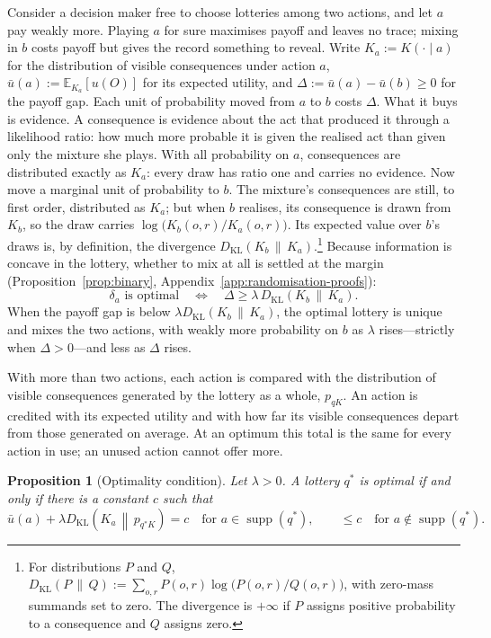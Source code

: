 \documentclass[11pt,a4paper]{article}
\newtheorem{proposition}[theorem]{Proposition}
\theoremstyle{definition}
\newcommand{\E}{\mathbb E}
\newcommand{\supp}{\operatorname{supp}}
\newcommand{\KL}{D_{\mathrm{KL}}}
\newcommand{\1}{\mathbf 1}
\begin{document}
Consider a decision maker free to choose lotteries among two actions, and let $a$ pay weakly more.  Playing $a$ for sure maximises payoff and leaves no
trace; mixing in $b$ costs payoff but gives the record something to reveal.  Write $K_a:=K(\cdot\mid a)$ for the distribution of visible
consequences under action $a$, $\bar u(a):=\E_{K_a}[u(O)]$ for its expected utility, and
$\Delta:=\bar u(a)-\bar u(b)\ge0$ for the payoff gap.  Each unit of probability moved from $a$ to $b$ costs
$\Delta$.  What it buys is evidence.  A consequence is evidence about the act that produced it through a
likelihood ratio: how much more probable it is given the realised act than given only the mixture she plays.
With all probability on $a$, consequences are distributed exactly as $K_a$: every draw has ratio one and
carries no evidence.  Now move a marginal unit of probability to $b$.  The mixture's consequences are still,
to first order, distributed as $K_a$; but when $b$ realises, its consequence is drawn from $K_b$, so the draw
carries $\log\bigl(K_b(o,r)/K_a(o,r)\bigr)$.  Its expected value over $b$'s draws is, by definition, the
divergence $\KL(K_b\,\|\,K_a)$.\footnote{For distributions $P$ and $Q$,
$\KL(P\,\|\,Q):=\sum_{o,r}P(o,r)\log\bigl(P(o,r)/Q(o,r)\bigr)$, with zero-mass summands set to zero.  The
divergence is $+\infty$ if $P$ assigns positive probability to a consequence and $Q$ assigns zero.}  Because
information is concave in the lottery, whether to mix at all is settled at the margin (Proposition~\ref{prop:binary},
Appendix~\ref{app:randomisation-proofs}):
\[
 \delta_a\text{ is optimal}
 \quad\Longleftrightarrow\quad
 \Delta\ge\lambda\,\KL(K_b\,\|\,K_a).
\]
When the payoff gap is below $\lambda\KL(K_b\,\|\,K_a)$, the optimal lottery is unique and mixes the two
actions, with weakly more probability on $b$ as $\lambda$ rises---strictly when $\Delta>0$---and less as $\Delta$ rises.


With more than two actions, each action is compared with the distribution of visible consequences generated by
the lottery as a whole, $p_{qK}$. An action is credited with its expected utility and with how far its visible consequences depart from those generated on average.  At an optimum this total is the same for every action in use; an unused action cannot
offer more.

\begin{proposition}[Optimality condition]\label{prop:optimal-choice}
Let $\lambda>0$.  A lottery $q^*$ is optimal if and only if there is a constant $c$ such that
\[
 \bar u(a)+\lambda\KL\!\left(K_a\,\middle\|\,p_{q^*K}\right)=c
 \quad\text{for }a\in\supp(q^*),
 \qquad
 \le c\quad\text{for }a\notin\supp(q^*).
\]
\end{proposition}
\end{document}
